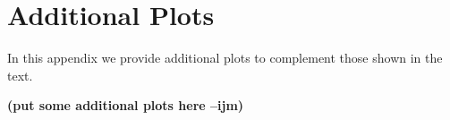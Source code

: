 \documentclass[11pt,letterpaper]{article}
\newcommand{\ijm}[1]{\textbf{\textcolor{llblue}{(#1 --ijm)}}}
\begin{document}
\appendix

\section{Additional Plots}\label{app:more_plot}

In this appendix we provide additional plots to complement those shown in the text.

\ijm{put some additional plots here}

%
%
%
%
%
%

%
%
%
%
%
%
%
%
%


%
%
%
%
%
%
%
%
%
%
%
\end{document}
